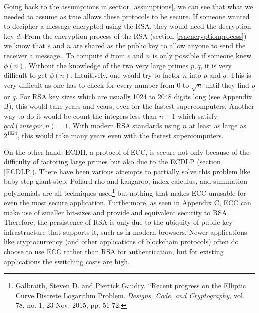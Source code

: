 \documentclass[a4paper,12pt]{article}
\theoremstyle{definition}
\begin{document}
Going back to the assumptions in section \ref{assumptions}, we can see that what we needed to assume as true allows these protocols to be secure. If someone wanted to decipher a message encrypted using the RSA, they would need the decryption key $d$. From the encryption process of the RSA (section \ref{rsaencryptionprocess}) we know that $e$ and $n$ are shared as the public key to allow anyone to send the receiver a message.. To compute $d$ from $e$ and $n$ is only possible if someone knew $\phi(n)$. Without the knowledge of the two very large primes $p,q$, it is very difficult to get $\phi(n)$. Intuitively, one would try to factor $n$ into $p$ and $q$. This is very difficult as one has to check for every number from 0 to $\sqrt{n}$ until they find $p$ or $q$. For RSA key sizes which are usually 1024 to 2048 digits long (see Appendix B), this would take years and years, even for the fastest supercomputers. Another way to do it would be count the integers less than $n-1$ which satisfy $gcd(integer,n)=1$. With modern RSA standards using $n$ at least as large as $2^{1024}$, this would take many years even with the fastest supercomputers.

On the other hand, ECDH, a protocol of ECC, is secure not only because of the difficulty of factoring large primes but also due to the ECDLP (section \ref{ECDLP}). There have been various attempts to partially solve this problem like baby-step-giant-step, Pollard rho and kangaroo, index calculus, and summation polynomials are all techniques used\footnote{Galbraith, Steven D. and Pierrick Gaudry. ``Recent progress on the Elliptic Curve Discrete Logarithm Problem. \textit{Designs, Code, and Cryptography,} vol. 78, no. 1, 23 Nov. 2015, pp. 51-72.} but nothing that makes ECC unusable for even the most secure application. Furthermore, as seen in Appendix C, ECC can make use of smaller bit-sizes and provide and equivalent security to RSA. Therefore, the persistence of RSA is only due to the ubiquity of public key infrastructure that supports it, such as in modern browsers. Newer applications like cryptocurrency (and other 
applications of blockchain protocols) often do choose to use ECC rather 
than RSA for authentication, but for existing applications the switching 
costs are high.








	
\end{document}
